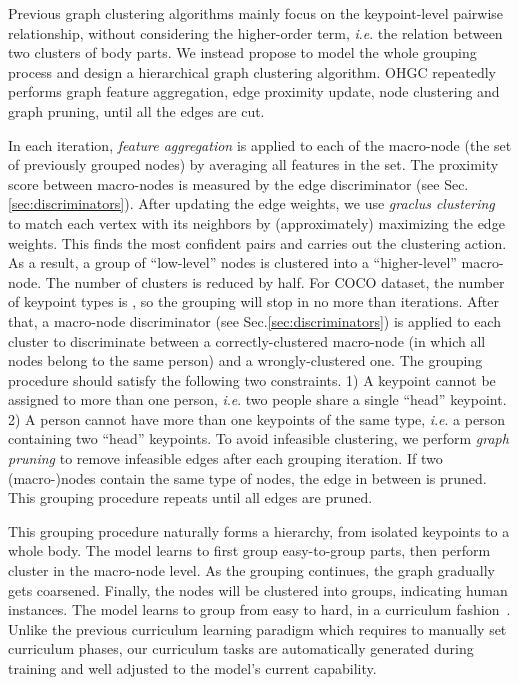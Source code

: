 \documentclass[runningheads]{llncs}
\newcommand{\ie}{\textit{i}.\textit{e}. }
\begin{document}
	Previous graph clustering algorithms mainly focus on the keypoint-level pairwise relationship, without considering the higher-order term, \ie the relation between two clusters of body parts. We instead propose to model the whole grouping process and design a hierarchical graph clustering algorithm. OHGC repeatedly performs graph feature aggregation, edge proximity update, node clustering and graph pruning, until all the edges are cut. 
	
	In each iteration, \emph{feature aggregation} is applied to each of the macro-node (the set of previously grouped nodes) by averaging all features in the set. The proximity score between macro-nodes is measured by the edge discriminator (see Sec.\ref{sec:discriminators}). After updating the edge weights, we use \emph{graclus clustering}~\cite{dhillon2007weighted} to match each vertex with its neighbors by (approximately) maximizing the edge weights. This finds the most confident pairs and carries out the clustering action. As a result, a group of ``low-level'' nodes is clustered into a ``higher-level'' macro-node. The number of clusters is reduced by half. For COCO dataset, the number of keypoint types is , so the grouping will stop in no more than  iterations. After that, a macro-node discriminator (see Sec.\ref{sec:discriminators}) is applied to each cluster to discriminate between a correctly-clustered macro-node (in which all nodes belong to the same person) and a wrongly-clustered one. The grouping procedure should satisfy the following two constraints. 1) A keypoint cannot be assigned to more than one person, \ie two people share a single ``head'' keypoint. 2) A person cannot have more than one keypoints of the same type, \ie a person containing two ``head'' keypoints. To avoid infeasible clustering, we perform \emph{graph pruning} to remove infeasible edges after each grouping iteration. If two (macro-)nodes contain the same type of nodes, the edge in between is pruned. This grouping procedure repeats until all edges are pruned. 
	
	This grouping procedure naturally forms a hierarchy, from isolated keypoints to a whole body. The model learns to first group easy-to-group parts, then perform cluster in the macro-node level. As the grouping continues, the graph gradually gets coarsened. Finally, the nodes will be clustered into  groups, indicating  human instances. The model learns to group from easy to hard, in a curriculum fashion~\cite{bengio2009curriculum}. Unlike the previous curriculum learning paradigm which requires to manually set curriculum phases, our curriculum tasks are automatically generated during training and well adjusted to the model’s current capability. 
	
\end{document}
